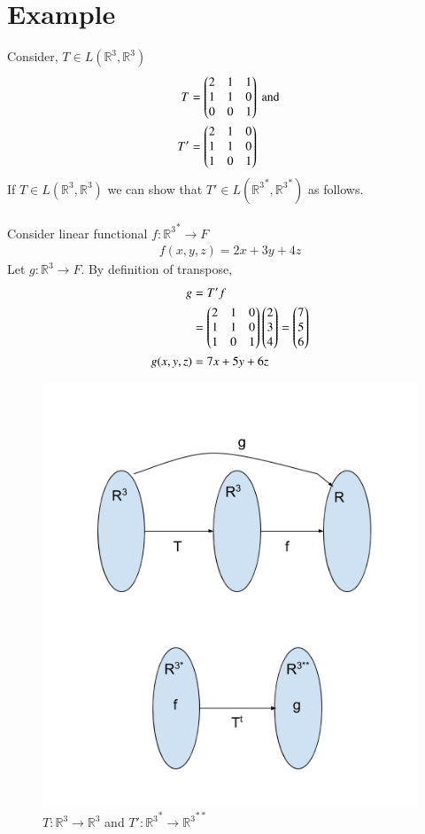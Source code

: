 \documentclass[journal,12pt,twocolumn]{IEEEtran}
\begin{document}
\section{Example}
Consider, $T \in L(\mathbb{R}^3,\mathbb{R}^3)$
\begin{align}
	T &= \begin{pmatrix}2 & 1 & 1\\ 1 & 1 & 0\\ 0 & 0 & 1\end{pmatrix} \text{ and }\\
	T' &= \begin{pmatrix}2 & 1 & 0\\1 & 1 & 0\\1 & 0 & 1\end{pmatrix}
\end{align}
If $T \in L(\mathbb{R}^3,\mathbb{R}^3)$ we can show that $T' \in L({\mathbb{R}^3}^*,{\mathbb{R}^3}^*)$ as follows.\\ 
\\Consider linear functional $f : {\mathbb{R}^3}^* \rightarrow F$ 
\begin{align}
	f(x,y,z) = 2x + 3y + 4z
\end{align}
Let $g : \mathbb{R}^3 \rightarrow F$. By definition of transpose,
\begin{align}
	g &= T'f\\
	&= \begin{pmatrix}2 & 1 & 0\\1 & 1 & 0\\1 & 0 & 1\end{pmatrix}\begin{pmatrix}2\\3\\4\end{pmatrix} = \begin{pmatrix}7\\5\\6\end{pmatrix}\\
	g(x,y,z) &= 7x + 5y + 6z
\end{align}
\begin{figure}[H]
\centering
\includegraphics[width=\columnwidth]{fig/transpose_example.png}
\caption{$T: \mathbb{R}^3 \rightarrow \mathbb{R}^3$ and $T': {\mathbb{R}^3}^* \rightarrow {\mathbb{R}^3}^{**}$}
\end{figure}
\end{document}
